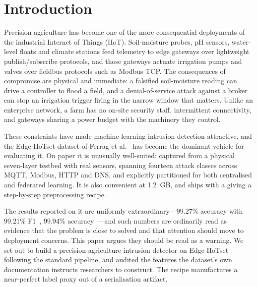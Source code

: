 \section{Introduction}
\label{sec:intro}

Precision agriculture has become one of the more consequential deployments of
the industrial Internet of Things (IIoT). Soil-moisture probes, pH sensors,
water-level floats and climate stations feed telemetry to edge gateways over
lightweight publish/subscribe protocols, and those gateways actuate irrigation
pumps and valves over fieldbus protocols such as Modbus TCP. The consequences
of compromise are physical and immediate: a falsified soil-moisture reading can
drive a controller to flood a field, and a denial-of-service attack against a
broker can stop an irrigation trigger firing in the narrow window that matters.
Unlike an enterprise network, a farm has no on-site security staff,
intermittent connectivity, and gateways sharing a power budget with the
machinery they control.

These constraints have made machine-learning intrusion detection attractive,
and the Edge-IIoTset dataset of Ferrag et al.~\cite{ferrag2022edgeiiotset} has
become the dominant vehicle for evaluating it. On paper it is unusually
well-suited: captured from a physical seven-layer testbed with real sensors,
spanning fourteen attack classes across MQTT, Modbus, HTTP and DNS, and
explicitly partitioned for both centralised and federated learning. It is also
convenient at 1.2~GB, and ships with a  giving a step-by-step
preprocessing recipe.

The results reported on it are uniformly extraordinary---99.27\% accuracy with
99.21\% F1~\cite{discover2026hybrid}, 99.94\%
accuracy~\cite{hasan2025autoencoder}---and such numbers are ordinarily read as
evidence that the problem is close to solved and that attention should move to
deployment concerns. This paper argues they should be read as a warning. We set
out to build a precision-agriculture intrusion detector on Edge-IIoTset
following the standard pipeline, and audited the features the dataset's own
documentation instructs researchers to construct. The recipe manufactures a
near-perfect label proxy out of a serialisation artifact.

